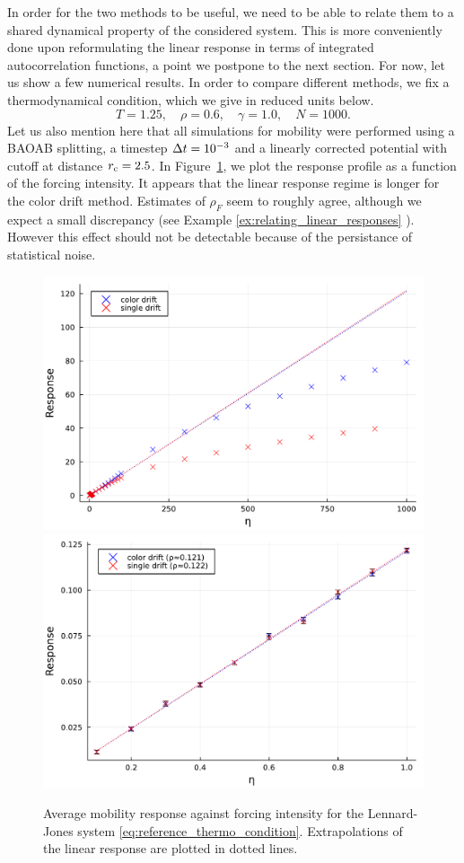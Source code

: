 In order for the two methods to be useful, we need to be able to relate them to a shared dynamical property of the considered system.
This is more conveniently done upon reformulating the linear response in terms of integrated autocorrelation functions, a point we postpone to the next section.
For now, let us show a few numerical results.
In order to compare different methods, we fix a thermodynamical condition, which we give in reduced units below.
\begin{equation}
    \label{eq:reference_thermo_condition}
    T=1.25,\quad \rho=0.6,\quad \gamma=1.0,\quad N=1000.
\end{equation}
Let us also mention here that all simulations for mobility were performed using a BAOAB splitting, a timestep ${\Delta t}=10^{-3}$ and a linearly corrected potential with cutoff at distance $r_{\rm c}=2.5$.
In Figure~\ref{fig:nemd_mobility_full}, we plot the response profile as a function of the forcing intensity. 
It appears that the linear response regime is longer for the color drift method.
Estimates of $\rho_F$ seem to roughly agree, although we expect a small discrepancy (see Example \ref{ex:relating_linear_responses} ). However this effect should not be detectable because of the persistance of statistical noise.
\begin{figure}[htbp]
    \begin{center}
      \includegraphics[width=0.7\linewidth]{figures/nemd/nemd_mobility_full.pdf}
      \includegraphics[width=0.7\linewidth]{figures/nemd/nemd_mobility_linear.pdf}
      \caption{ \label{fig:nemd_mobility_full}
        Average mobility response against forcing intensity for the Lennard-Jones system \eqref{eq:reference_thermo_condition}. Extrapolations of the linear response are plotted in dotted lines.
      }
    \end{center}
  \end{figure}

